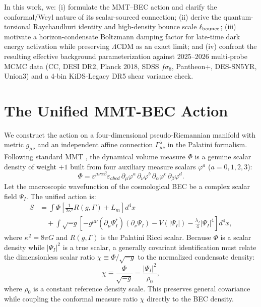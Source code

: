 \documentclass[preprint,12pt]{elsarticle}
\begin{document}
In this work, we: (i) formulate the MMT--BEC action and clarify the conformal/Weyl nature of its scalar-sourced connection; (ii) derive the quantum-torsional Raychaudhuri identity and high-density bounce scale $\ell_{\rm bounce}$; (iii) motivate a horizon-condensate Boltzmann damping factor for late-time dark energy activation while preserving $\Lambda$CDM as an exact limit; and (iv) confront the resulting effective background parameterization against 2025--2026 multi-probe MCMC data (CC, DESI DR2, Planck 2018, SDSS $f\sigma_8$, Pantheon+, DES-SN5YR, Union3) and a 4-bin KiDS-Legacy DR5 shear variance check.

\section{The Unified MMT-BEC Action}
\label{sec:action}

We construct the action on a four-dimensional pseudo-Riemannian manifold with metric $g_{\mu\nu}$ and an independent affine connection $\Gamma^\lambda_{\mu\nu}$ in the Palatini formalism. Following standard MMT \cite{Guendelman1999, Sur2021}, the dynamical volume measure $\Phi$ is a genuine scalar density of weight $+1$ built from four auxiliary measure scalars $\varphi^a$ ($a=0,1,2,3$):
\begin{equation}
    \Phi = \varepsilon^{\mu\nu\alpha\beta}\varepsilon_{abcd}\,\partial_\mu\varphi^a\,\partial_\nu\varphi^b\,\partial_\alpha\varphi^c\,\partial_\beta\varphi^d.
    \label{eq:phi_def}
\end{equation}
Let the macroscopic wavefunction of the cosmological BEC be a complex scalar field $\Psi_I$. The unified action is:
\begin{align}
    S &= \int \Phi \left[ \frac{1}{2\kappa^2} R(g,\Gamma) + L_{m} \right] d^4x \nonumber \\
      &\quad + \int \sqrt{-g} \left[ -g^{\mu\nu}(\partial_\mu \Psi_I^*)(\partial_\nu \Psi_I) - V(|\Psi_I|) - \frac{\lambda_I}{4}|\Psi_I|^4 \right] d^4x,
    \label{eq:action}
\end{align}
where $\kappa^2 = 8\pi G$ and $R(g,\Gamma)$ is the Palatini Ricci scalar. Because $\Phi$ is a scalar density while $|\Psi_I|^2$ is a true scalar, a generally covariant identification must relate the dimensionless scalar ratio $\chi \equiv \Phi/\sqrt{-g}$ to the normalized condensate density:
\begin{equation}
    \chi \equiv \frac{\Phi}{\sqrt{-g}} = \frac{|\Psi_I|^2}{\rho_0},
    \label{eq:chi_def}
\end{equation}
where $\rho_0$ is a constant reference density scale. This preserves general covariance while coupling the conformal measure ratio $\chi$ directly to the BEC density.
\end{document}
